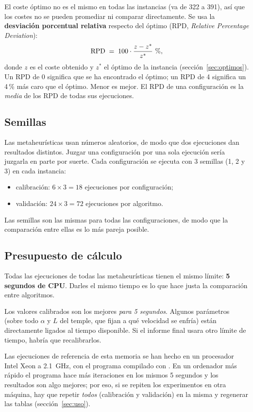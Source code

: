 El coste óptimo no es el mismo en todas las instancias (va de 322 a 391), así que los costes
no se pueden promediar ni comparar directamente. Se usa la \textbf{desviación porcentual
relativa} respecto del óptimo (RPD, \emph{Relative Percentage Deviation}):
\[
  \mathrm{RPD} \;=\; 100\cdot\frac{z-z^\ast}{z^\ast}\ \%,
\]
donde $z$ es el coste obtenido y $z^\ast$ el óptimo de la instancia
(sección~\ref{sec:optimos}). Un RPD de 0 significa que se ha encontrado el óptimo; un RPD de 4
significa un 4\,\% más caro que el óptimo. Menor es mejor. El RPD de una configuración es la
\emph{media} de los RPD de todas sus ejecuciones.

\subsection{Semillas}

Las metaheurísticas usan números aleatorios, de modo que dos ejecuciones dan resultados
distintos. Juzgar una configuración por una sola ejecución sería juzgarla en parte por
suerte. Cada configuración se ejecuta con 3 semillas (1, 2 y 3) en cada instancia:
\begin{itemize}
  \item calibración: $6\times 3=18$ ejecuciones por configuración;
  \item validación: $24\times 3=72$ ejecuciones por algoritmo.
\end{itemize}
Las semillas son las mismas para todas las configuraciones, de modo que la comparación entre
ellas es lo más pareja posible.

\subsection{Presupuesto de cálculo}

Todas las ejecuciones de todas las metaheurísticas tienen el mismo límite: \textbf{5 segundos
de CPU}. Darles el mismo tiempo es lo que hace justa la comparación entre algoritmos.

\begin{idea}
Los valores calibrados son los mejores \emph{para 5 segundos}. Algunos parámetros (sobre
todo $\alpha$ y $L$ del temple, que fijan a qué velocidad se enfría) están directamente
ligados al tiempo disponible. Si el informe final usara otro límite de tiempo, habría que
recalibrarlos.
\end{idea}

Las ejecuciones de referencia de esta memoria se han hecho en un procesador Intel Xeon a
2.1~GHz, con el programa compilado con . En un ordenador más rápido el programa
hace más iteraciones en los mismos 5 segundos y los resultados son algo mejores; por eso, si
se repiten los experimentos en otra máquina, hay que repetir \emph{todos} (calibración y
validación) en la misma y regenerar las tablas (sección~\ref{sec:uso}).

